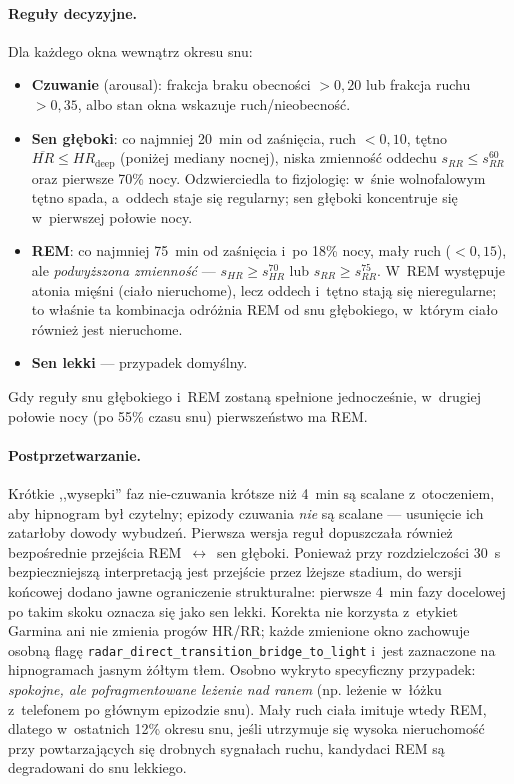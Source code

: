 \documentclass[12pt,a4paper,oneside]{report}
\begin{document}
\paragraph{Reguły decyzyjne.} Dla każdego okna wewnątrz okresu snu:
\begin{itemize}
  \item \textbf{Czuwanie} (arousal): frakcja braku obecności $> 0{,}20$ lub
  frakcja ruchu $> 0{,}35$, albo stan okna wskazuje ruch/nieobecność.
  \item \textbf{Sen głęboki}: co najmniej \SI{20}{min} od zaśnięcia, ruch
  $< 0{,}10$, tętno $\overline{HR} \leq HR_{\text{deep}}$ (poniżej mediany
  nocnej), niska zmienność oddechu $s_{RR} \leq s_{RR}^{60}$ oraz pierwsze
  70\% nocy. Odzwierciedla to fizjologię: w~śnie wolnofalowym tętno spada,
  a~oddech staje się regularny; sen głęboki koncentruje się w~pierwszej
  połowie nocy.
  \item \textbf{REM}: co najmniej \SI{75}{min} od zaśnięcia i~po 18\% nocy,
  mały ruch ($< 0{,}15$), ale \emph{podwyższona zmienność} --- $s_{HR} \geq
  s_{HR}^{70}$ lub $s_{RR} \geq s_{RR}^{75}$. W~REM występuje atonia mięśni
  (ciało nieruchome), lecz oddech i~tętno stają się nieregularne; to właśnie
  ta kombinacja odróżnia REM od snu głębokiego, w~którym ciało również jest
  nieruchome.
  \item \textbf{Sen lekki} --- przypadek domyślny.
\end{itemize}
Gdy reguły snu głębokiego i~REM zostaną spełnione jednocześnie, w~drugiej
połowie nocy (po 55\% czasu snu) pierwszeństwo ma REM.

\paragraph{Postprzetwarzanie.} Krótkie ,,wysepki'' faz nie-czuwania krótsze
niż \SI{4}{min} są scalane z~otoczeniem, aby hipnogram był czytelny; epizody
czuwania \emph{nie} są scalane --- usunięcie ich zatarłoby dowody wybudzeń.
Pierwsza wersja reguł dopuszczała również bezpośrednie przejścia
REM~$\leftrightarrow$~sen głęboki. Ponieważ przy rozdzielczości
\SI{30}{s} bezpieczniejszą interpretacją jest przejście przez lżejsze stadium,
do wersji końcowej dodano jawne ograniczenie strukturalne: pierwsze
\SI{4}{min} fazy docelowej po takim skoku oznacza się jako sen lekki. Korekta
nie korzysta z~etykiet Garmina ani nie zmienia progów HR/RR; każde zmienione
okno zachowuje osobną flagę
\texttt{radar\_direct\_transition\_bridge\_to\_light} i~jest zaznaczone na
hipnogramach jasnym żółtym tłem.
Osobno wykryto specyficzny przypadek: \emph{spokojne, ale pofragmentowane
leżenie nad ranem} (np. leżenie w~łóżku z~telefonem po głównym epizodzie snu).
Mały ruch ciała imituje wtedy REM, dlatego w~ostatnich 12\% okresu snu, jeśli
utrzymuje się wysoka nieruchomość przy powtarzających się drobnych sygnałach
ruchu, kandydaci REM są degradowani do snu lekkiego.
\end{document}
